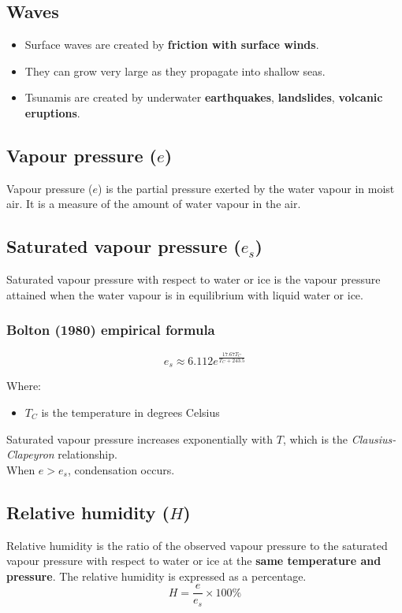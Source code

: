 \documentclass[11pt]{article}
\begin{document}
\subsection{Waves}
\label{sec:org8496b4b}
\begin{itemize}
\item Surface waves are created by \textbf{friction with surface winds}.
\item They can grow very large as they propagate into shallow seas.
\item Tsunamis are created by underwater \textbf{earthquakes}, \textbf{landslides}, \textbf{volcanic eruptions}.
\end{itemize}

\subsection{Vapour pressure (\(e\))}
\label{sec:org9bb41e3}
Vapour pressure (\(e\)) is the partial pressure exerted by the water vapour in moist air. It is a measure of the amount of water vapour in the air.

\newpage

\subsection{Saturated vapour pressure (\(e_s\))}
\label{sec:org3878959}
Saturated vapour pressure with respect to water or ice is the vapour pressure attained when the water vapour is in equilibrium with liquid water or ice.

\subsubsection{Bolton (1980) empirical formula}
\label{sec:orgd17aa6e}
\[e_s \approx 6.112e^{\frac{17.67 T_C}{T_C + 243.5}}\]

Where:
\begin{itemize}
\item \(T_C\) is the temperature in degrees Celsius
\end{itemize}

Saturated vapour pressure increases exponentially with \(T\), which is the \emph{Clausius-Clapeyron} relationship.
\\[0pt]

When \(e > e_s\), condensation occurs.

\subsection{Relative humidity (\(H\))}
\label{sec:org2dcc7d0}
Relative humidity is the ratio of the observed vapour pressure to the saturated vapour pressure with respect to water or ice at the \textbf{same temperature and pressure}. The relative humidity is expressed as a percentage.
\[H = \frac{e}{e_s} \times 100\% \]
\end{document}
